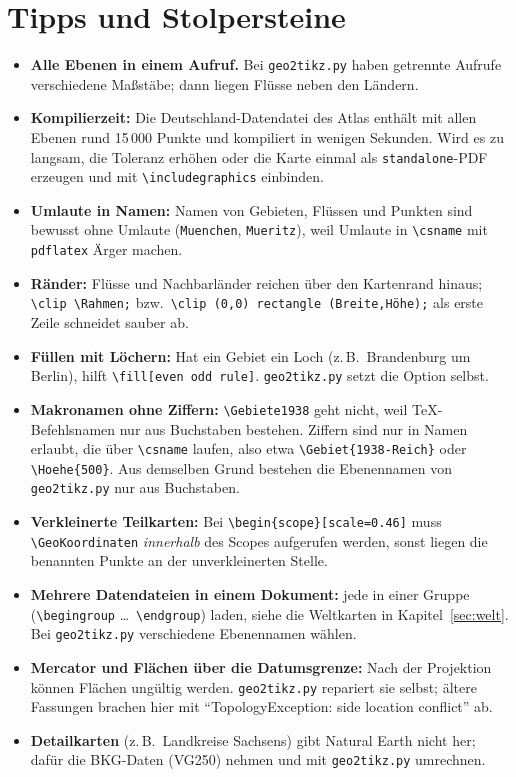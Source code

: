 \section{Tipps und Stolpersteine}

\begin{itemize}
	\item \textbf{Alle Ebenen in einem Aufruf.} Bei \texttt{geo2tikz.py} haben getrennte Aufrufe verschiedene Maßstäbe; dann liegen Flüsse neben den Ländern.
	\item \textbf{Kompilierzeit:} Die Deutschland-Datendatei des Atlas enthält mit allen Ebenen rund 15\,000 Punkte und kompiliert in wenigen Sekunden. Wird es zu langsam, die Toleranz erhöhen oder die Karte einmal als \texttt{standalone}-PDF erzeugen und mit \texttt{\textbackslash includegraphics} einbinden.
	\item \textbf{Umlaute in Namen:} Namen von Gebieten, Flüssen und Punkten sind bewusst ohne Umlaute (\texttt{Muenchen}, \texttt{Mueritz}), weil Umlaute in \texttt{\textbackslash csname} mit \texttt{pdflatex} Ärger machen.
	\item \textbf{Ränder:} Flüsse und Nachbarländer reichen über den Kartenrand hinaus; \texttt{\textbackslash clip \textbackslash Rahmen;} bzw.\ \texttt{\textbackslash clip (0,0) rectangle (Breite,Höhe);} als erste Zeile schneidet sauber ab.
	\item \textbf{Füllen mit Löchern:} Hat ein Gebiet ein Loch (z.\,B.\ Brandenburg um Berlin), hilft \texttt{\textbackslash fill[even odd rule]}. \texttt{geo2tikz.py} setzt die Option selbst.
	\item \textbf{Makronamen ohne Ziffern:} \texttt{\textbackslash Gebiete1938} geht nicht, weil TeX-Befehlsnamen nur aus Buchstaben bestehen. Ziffern sind nur in Namen erlaubt, die über \texttt{\textbackslash csname} laufen, also etwa \texttt{\textbackslash Gebiet\{1938-Reich\}} oder \texttt{\textbackslash Hoehe\{500\}}. Aus demselben Grund bestehen die Ebenennamen von \texttt{geo2tikz.py} nur aus Buchstaben.
	\item \textbf{Verkleinerte Teilkarten:} Bei \texttt{\textbackslash begin\{scope\}[scale=0.46]} muss \texttt{\textbackslash GeoKoordinaten} \textit{innerhalb} des Scopes aufgerufen werden, sonst liegen die benannten Punkte an der unverkleinerten Stelle.
	\item \textbf{Mehrere Datendateien in einem Dokument:} jede in einer Gruppe (\texttt{\textbackslash begingroup} \dots\ \texttt{\textbackslash endgroup}) laden, siehe die Weltkarten in Kapitel~\ref{sec:welt}. Bei \texttt{geo2tikz.py} verschiedene Ebenennamen wählen.
	\item \textbf{Mercator und Flächen über die Datumsgrenze:} Nach der Projektion können Flächen ungültig werden. \texttt{geo2tikz.py} repariert sie selbst; ältere Fassungen brachen hier mit \enquote{TopologyException: side location conflict} ab.
	\item \textbf{Detailkarten} (z.\,B.\ Landkreise Sachsens) gibt Natural Earth nicht her; dafür die BKG-Daten (VG250) nehmen und mit \texttt{geo2tikz.py} umrechnen.
\end{itemize}



